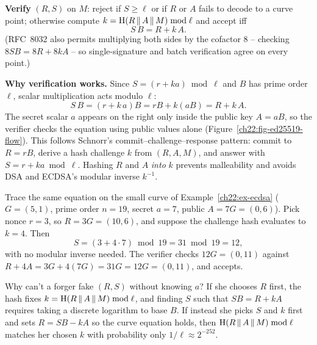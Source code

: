 \textbf{Verify} $(R, S)$ on $M$: reject if $S \ge \ell$ or if $R$ or $A$ fails to decode to a curve point; otherwise compute $k = \operatorname{H}(R\,\|\, A\,\|\, M)\bmod \ell$ and accept iff
\[
  S\,B = R + k\,A.
\]
(RFC~8032 also permits multiplying both sides by the cofactor $8$ -- checking $8 S B = 8 R + 8 k A$ -- so single-signature and batch verification agree on every point.)

\begin{whybox}
\textbf{Why verification works.} Since $S = (r + ka) \bmod \ell$ and $B$ has prime order $\ell$, scalar multiplication acts modulo $\ell$:
\[
  S\,B = (r + k\,a)B = rB + k(aB) = R + k\,A.
\]
The secret scalar $a$ appears on the right only inside the public key $A = aB$, so the verifier checks the equation using public values alone (Figure~\ref{ch22:fig-ed25519-flow}). This follows Schnorr's commit--challenge--response pattern: commit to $R = rB$, derive a hash challenge $k$ from $(R, A, M)$, and answer with $S = r + ka \bmod \ell$. Hashing $R$ and $A$ \emph{into} $k$ prevents malleability and avoids DSA and ECDSA's modular inverse $k^{-1}$.

Trace the same equation on the small curve of Example~\ref{ch22:ex-ecdsa} ($G = (5,1)$, prime order $n = 19$, secret $a = 7$, public $A = 7G = (0,6)$). Pick nonce $r = 3$, so $R = 3G = (10,6)$, and suppose the challenge hash evaluates to $k = 4$. Then
\[
  S = (3 + 4\cdot 7) \bmod 19 = 31 \bmod 19 = 12,
\]
with no modular inverse needed. The verifier checks $12G = (0,11)$ against $R + 4A = 3G + 4(7G) = 31G = 12G = (0,11)$, and accepts.

Why can't a forger fake $(R, S)$ without knowing $a$? If she chooses $R$ first, the hash fixes $k = \operatorname{H}(R \,\|\, A \,\|\, M) \bmod \ell$, and finding $S$ such that $SB = R + kA$ requires taking a discrete logarithm to base $B$. If instead she picks $S$ and $k$ first and sets $R = SB - kA$ so the curve equation holds, then $\operatorname{H}(R \,\|\, A \,\|\, M) \bmod \ell$ matches her chosen $k$ with probability only $1/\ell \approx 2^{-252}$.
\end{whybox}

